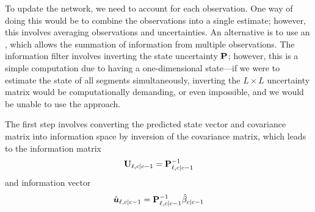 To update the network, we need to account for each observation. One way of doing this would be to combine the observations into a single estimate; however, this involves averaging observations and uncertainties. An alternative is to use an \emph{\infil{}} \citep{cn}, which allows the summation of information from multiple observations. The information filter involves inverting the state uncertainty $\mathbf{P}$; however, this is a simple computation due to having a one-dimensional state---if we were to estimate the state of all segments simultaneously, inverting the $L\times L$ uncertainty matrix would be computationally demanding, or even impossible, and we would be unable to use the approach.




The first step involves converting the predicted state vector and covariance matrix into information space by inversion of the covariance matrix, which leads to the information matrix
\begin{equation}\label{eq:nw_if_inf_matrix}
\mathbf{U}_{\ell,c|c-1} = \mathbf{P}_{\ell,c|c-1}^{-1}
\end{equation}
and information vector
\begin{equation}\label{eq:nw_if_inf_vector}
\hat{\boldsymbol{u}}_{\ell,c|c-1} = \mathbf{P}_{\ell,c|c-1}^{-1} \hat{\beta}_{c|c-1}
\end{equation}


